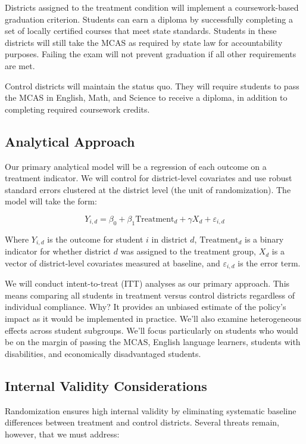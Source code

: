 \documentclass[12pt]{article}
\begin{document}
Districts assigned to the treatment condition will implement a coursework-based graduation criterion. Students can earn a diploma by successfully completing a set of locally certified courses that meet state standards. Students in these districts will still take the MCAS as required by state law for accountability purposes. Failing the exam will not prevent graduation if all other requirements are met.

Control districts will maintain the status quo. They will require students to pass the MCAS in English, Math, and Science to receive a diploma, in addition to completing required coursework credits.

\subsection{Analytical Approach}

Our primary analytical model will be a regression of each outcome on a treatment indicator. We will control for district-level covariates and use robust standard errors clustered at the district level (the unit of randomization). The model will take the form:

\begin{equation}
Y_{i,d} = \beta_0 + \beta_1\text{Treatment}_d + \gamma X_d + \varepsilon_{i,d}
\end{equation}

Where $Y_{i,d}$ is the outcome for student $i$ in district $d$, $\text{Treatment}_d$ is a binary indicator for whether district $d$ was assigned to the treatment group, $X_d$ is a vector of district-level covariates measured at baseline, and $\varepsilon_{i,d}$ is the error term.

We will conduct intent-to-treat (ITT) analyses as our primary approach. This means comparing all students in treatment versus control districts regardless of individual compliance. Why? It provides an unbiased estimate of the policy's impact as it would be implemented in practice. We'll also examine heterogeneous effects across student subgroups. We'll focus particularly on students who would be on the margin of passing the MCAS, English language learners, students with disabilities, and economically disadvantaged students.

\subsection{Internal Validity Considerations}

Randomization ensures high internal validity by eliminating systematic baseline differences between treatment and control districts. Several threats remain, however, that we must address:
\end{document}
